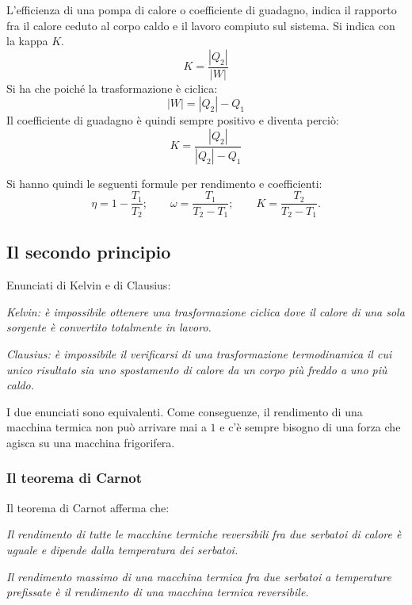 \documentclass{article}
\begin{document}
L'efficienza di una pompa di calore o coefficiente di guadagno, indica il rapporto fra il calore ceduto al corpo caldo e il lavoro compiuto sul sistema. Si indica con la kappa $K$.
\begin{equation}
    K=\frac{|Q_2|}{|W|}
\end{equation}
Si ha che poiché la trasformazione è ciclica:
\begin{equation}
    |W|=|Q_2|-Q_1
\end{equation}
Il coefficiente di guadagno è quindi sempre positivo e diventa perciò:
\begin{equation}
    K=\frac{|Q_2|}{|Q_2|-Q_1}
\end{equation}

Si hanno quindi le seguenti formule per rendimento e coefficienti:
\begin{equation}
    \eta=1-\frac{T_1}{T_2}; \qquad \omega=\frac{T_1}{T_2-T_1}; \qquad K=\frac{T_2}{T_2-T_1}.
\end{equation}


\subsection{Il secondo principio}
Enunciati di Kelvin e di Clausius:
\vspace{5mm}

\textit{Kelvin: è impossibile ottenere una trasformazione ciclica dove il calore di una sola sorgente è convertito totalmente in lavoro.}

\textit{Clausius: è impossibile il verificarsi di una trasformazione termodinamica il cui unico risultato sia uno spostamento di calore da un corpo più freddo a uno più caldo.}
\vspace{5mm}

I due enunciati sono equivalenti. Come conseguenze, il rendimento di una macchina termica non può arrivare mai a $1$ e c'è sempre bisogno di una forza che agisca su una macchina frigorifera.

\subsubsection{Il teorema di Carnot}
Il teorema di Carnot afferma che:
\vspace{3mm}

\textit{Il rendimento di tutte le macchine termiche reversibili fra due serbatoi di calore è uguale e dipende dalla temperatura dei serbatoi.}

\textit{Il rendimento massimo di una macchina termica fra due serbatoi a temperature prefissate è il rendimento di una macchina termica reversibile.}
\vspace{3mm}
\end{document}
